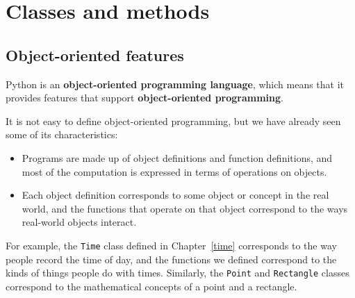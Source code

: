 


\chapter{Classes and methods}


\section{Object-oriented features}

Python is an {\bf object-oriented programming language}, which means
that it provides features that support {\bf object-oriented
programming}.

It is not easy to define object-oriented programming, but we have
already seen some of its characteristics:

\begin{itemize}

\item Programs are made up of object definitions and function
definitions, and most of the computation is expressed in terms
of operations on objects.

\item Each object definition corresponds to some object or concept
in the real world, and the functions that operate on that object
correspond to the ways real-world objects interact.

\end{itemize}

For example, the {\tt Time} class defined in Chapter~\ref{time}
corresponds to the way people record the time of day, and the
functions we defined correspond to the kinds of things people do with
times.  Similarly, the {\tt Point} and {\tt Rectangle} classes
correspond to the mathematical concepts of a point and a rectangle.

